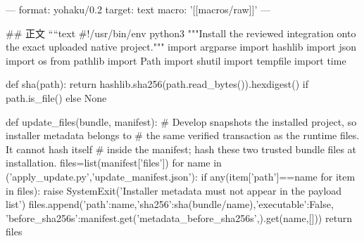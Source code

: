 ---
format: yohaku/0.2
target: text
macro: '[[macros/raw]]'
---

## 正文
````text
#!/usr/bin/env python3
"""Install the reviewed integration onto the exact uploaded native project."""
import argparse
import hashlib
import json
import os
from pathlib import Path
import shutil
import tempfile
import time

def sha(path):
    return hashlib.sha256(path.read_bytes()).hexdigest() if path.is_file() else None

def update_files(bundle, manifest):
    # Develop snapshots the installed project, so installer metadata belongs to
    # the same verified transaction as the runtime files. It cannot hash itself
    # inside the manifest; hash these two trusted bundle files at installation.
    files=list(manifest['files'])
    for name in ('apply_update.py','update_manifest.json'):
        if any(item['path']==name for item in files):
            raise SystemExit('Installer metadata must not appear in the payload list')
        files.append({'path':name,'sha256':sha(bundle/name),'executable':False,
                      'before_sha256s':manifest.get('metadata_before_sha256s',{}).get(name,[])})
    return files

